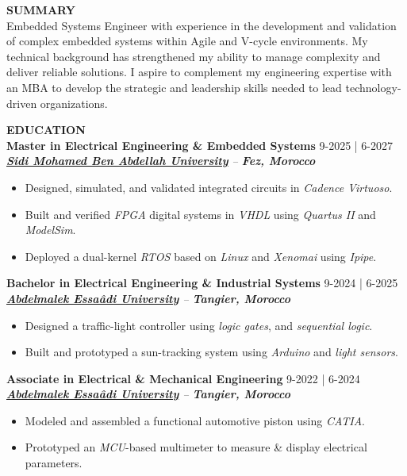 \documentclass{article}
\begin{document}
\begin{minipage}[t]{0.66\textwidth}

{\color{sectionteal}\large\bfseries SUMMARY} \\[0.1em]
Embedded Systems Engineer with experience in the development and validation of complex embedded systems within Agile and V-cycle environments. My technical background has strengthened my ability to manage complexity and deliver reliable solutions. I aspire to complement my engineering expertise with an MBA to develop the strategic and leadership skills needed to lead technology-driven organizations.
 
\vspace{2em}
{\color{sectionteal}\large\bfseries EDUCATION} \\[0.1em]
\textbf{Master in Electrical Engineering \& Embedded Systems} \hfill 9-2025 | 6-2027 \\
\textit{\href{https://www.usmba.ac.ma/}{\textbf{Sidi Mohamed Ben Abdellah University}} -- \textbf{Fez, Morocco}}\\[-1.15em]
\begin{itemize}[leftmargin=*, label={-}, itemsep=0.15em, topsep=0pt, parsep=0pt]
\item Designed, simulated, and validated integrated circuits in \textit{Cadence Virtuoso}.
\item Built and verified \textit{FPGA} digital systems in \textit{VHDL} using \textit{Quartus II} and \textit{ModelSim}.
\item Deployed a dual-kernel \textit{RTOS} based on \textit{Linux} and \textit{Xenomai} using \textit{Ipipe}.
\end{itemize}
\vspace{1em}
\textbf{Bachelor in Electrical Engineering \& Industrial Systems} \hfill 9-2024 | 6-2025 \\
\textit{\href{https://www.uae.ac.ma/}{\textbf{Abdelmalek Essaâdi University}} -- \textbf{Tangier, Morocco}}\\[-1.15em]
\begin{itemize}[leftmargin=*, label={-}, itemsep=0.15em, topsep=0pt, parsep=0pt]
\item Designed a traffic-light controller using \textit{logic gates}, and \textit{sequential logic}.
\item Built and prototyped a sun-tracking system using \textit{Arduino} and \textit{light sensors}.
\end{itemize}
\vspace{1em}
\textbf{Associate in Electrical  \& Mechanical Engineering} \hfill 9-2022 | 6-2024 \\
\textit{\href{https://www.uae.ac.ma/}{\textbf{Abdelmalek Essaâdi University}} -- \textbf{Tangier, Morocco}}\\[-1.15em]
\begin{itemize}[leftmargin=*, label={-}, itemsep=0.15em, topsep=0pt, parsep=0pt]
\item Modeled and assembled a functional automotive piston using \textit{CATIA}.
\item Prototyped an \textit{MCU}-based multimeter to measure \& display electrical parameters.
\end{itemize}


\end{minipage}
\end{document}
